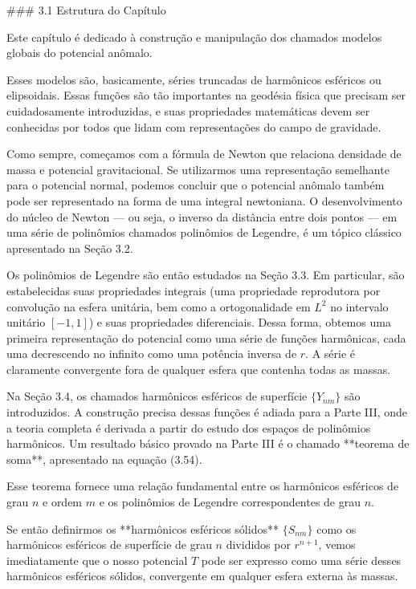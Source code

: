 



### 3.1 Estrutura do Capítulo

Este capítulo é dedicado à construção e manipulação dos chamados modelos globais do potencial anômalo.

Esses modelos são, basicamente, séries truncadas de harmônicos esféricos ou elipsoidais. Essas funções são tão importantes na geodésia física que precisam ser cuidadosamente introduzidas, e suas propriedades matemáticas devem ser conhecidas por todos que lidam com representações do campo de gravidade.

Como sempre, começamos com a fórmula de Newton que relaciona densidade de massa e potencial gravitacional. Se utilizarmos uma representação semelhante para o potencial normal, podemos concluir que o potencial anômalo também pode ser representado na forma de uma integral newtoniana. O desenvolvimento do núcleo de Newton — ou seja, o inverso da distância entre dois pontos — em uma série de polinômios chamados polinômios de Legendre, é um tópico clássico apresentado na Seção 3.2.

Os polinômios de Legendre são então estudados na Seção 3.3. Em particular, são estabelecidas suas propriedades integrais (uma propriedade reprodutora por convolução na esfera unitária, bem como a ortogonalidade em $L^2$ no intervalo unitário $[-1,1]$) e suas propriedades diferenciais. Dessa forma, obtemos uma primeira representação do potencial como uma série de funções harmônicas, cada uma decrescendo no infinito como uma potência inversa de $r$. A série é claramente convergente fora de qualquer esfera que contenha todas as massas.

Na Seção 3.4, os chamados harmônicos esféricos de superfície $\{Y_{nm}\}$ são introduzidos. A construção precisa dessas funções é adiada para a Parte III, onde a teoria completa é derivada a partir do estudo dos espaços de polinômios harmônicos. Um resultado básico provado na Parte III é o chamado **teorema de soma**, apresentado na equação (3.54).

Esse teorema fornece uma relação fundamental entre os harmônicos esféricos de grau $n$ e ordem $m$ e os polinômios de Legendre correspondentes de grau $n$.

Se então definirmos os **harmônicos esféricos sólidos** $\{S_{nm}\}$ como os harmônicos esféricos de superfície de grau $n$ divididos por $r^{n+1}$, vemos imediatamente que o nosso potencial $T$ pode ser expresso como uma série desses harmônicos esféricos sólidos, convergente em qualquer esfera externa às massas.

